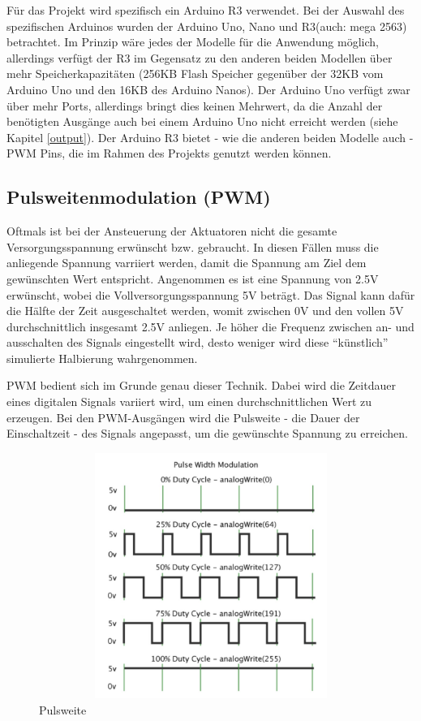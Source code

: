 Für das Projekt wird spezifisch ein Arduino R3 verwendet. Bei der Auswahl des spezifischen Arduinos wurden der Arduino Uno, Nano und R3(auch: mega 2563) betrachtet.
Im Prinzip wäre jedes der Modelle für die Anwendung möglich, allerdings verfügt der R3 im Gegensatz zu den anderen beiden Modellen über mehr Speicherkapazitäten (256KB Flash Speicher
gegenüber der 32KB vom Arduino Uno und den 16KB des Arduino Nanos).
Der Arduino Uno verfügt zwar über mehr Ports, allerdings bringt dies keinen Mehrwert, da die Anzahl der benötigten Ausgänge auch bei einem Arduino Uno nicht erreicht werden
(siehe Kapitel \ref{output}).
Der Arduino R3 bietet - wie die anderen beiden Modelle auch - \ac{PWM} Pins, die im Rahmen des Projekts genutzt werden können.

\subsection{Pulsweitenmodulation (PWM)}\label{PWM}
Oftmals ist bei der Ansteuerung der Aktuatoren nicht die gesamte Versorgungsspannung erwünscht bzw. gebraucht.
In diesen Fällen muss die anliegende Spannung varriiert werden, damit die Spannung am Ziel dem gewünschten Wert entspricht.
Angenommen es ist eine Spannung von 2.5V erwünscht, wobei die Vollversorgungsspannung 5V beträgt.
Das Signal kann dafür die Hälfte der Zeit ausgeschaltet werden, womit zwischen 0V und den vollen 5V durchschnittlich insgesamt 2.5V anliegen.
Je höher die Frequenz zwischen an- und ausschalten des Signals eingestellt wird, desto weniger wird diese ``künstlich'' simulierte Halbierung wahrgenommen.

\ac{PWM} bedient sich im Grunde genau dieser Technik.
Dabei wird die Zeitdauer eines digitalen Signals variiert wird, um einen durchschnittlichen Wert zu erzeugen.
Bei den \ac{PWM}-Ausgängen wird die Pulsweite - die Dauer der Einschaltzeit - des Signals angepasst, um die gewünschte Spannung zu erreichen.

\begin{figure}[htbp]
	\centering
	\includegraphics [width=13cm, height=8cm] {img/pulsweite}
	\caption{Pulsweite}
	\label{fig:pulsweite}
\end{figure}

